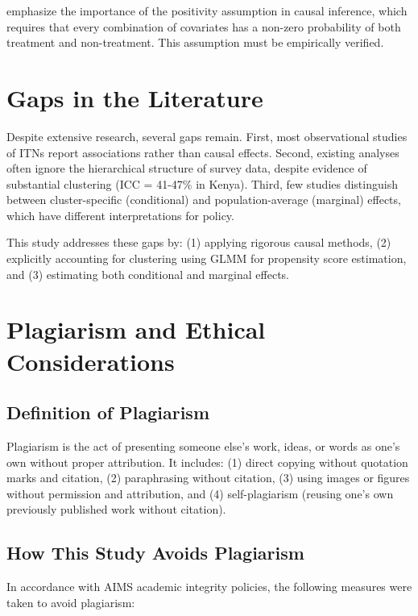 \citet{westreich2010invited} emphasize the importance of the positivity assumption in causal inference, which requires that every combination of covariates has a non-zero probability of both treatment and non-treatment. This assumption must be empirically verified.

\section{Gaps in the Literature}

Despite extensive research, several gaps remain. First, most observational studies of ITNs report associations rather than causal effects. Second, existing analyses often ignore the hierarchical structure of survey data, despite evidence of substantial clustering (ICC = 41-47\% in Kenya). Third, few studies distinguish between cluster-specific (conditional) and population-average (marginal) effects, which have different interpretations for policy.

This study addresses these gaps by: (1) applying rigorous causal methods, (2) explicitly accounting for clustering using GLMM for propensity score estimation, and (3) estimating both conditional and marginal effects.

\section{Plagiarism and Ethical Considerations}

\subsection{Definition of Plagiarism}

Plagiarism is the act of presenting someone else's work, ideas, or words as one's own without proper attribution. It includes: (1) direct copying without quotation marks and citation, (2) paraphrasing without citation, (3) using images or figures without permission and attribution, and (4) self-plagiarism (reusing one's own previously published work without citation).

\subsection{How This Study Avoids Plagiarism}

In accordance with AIMS academic integrity policies, the following measures were taken to avoid plagiarism:

